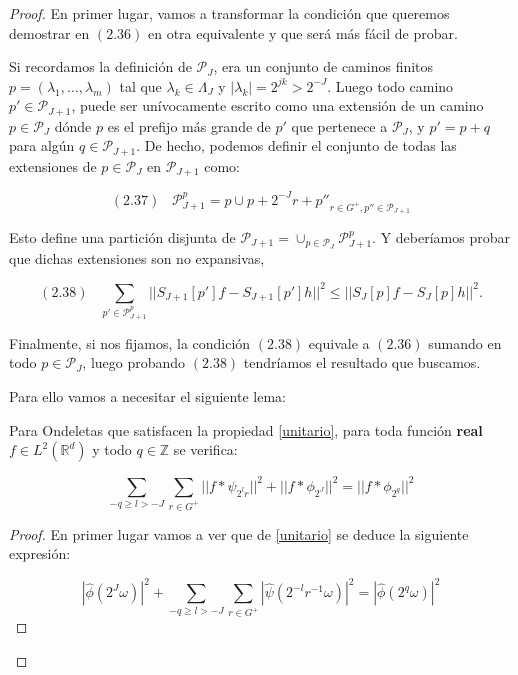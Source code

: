 \begin{proof}

\noindent En primer lugar, vamos a transformar la condición que queremos demostrar en $(2.36)$ en otra equivalente y que será más fácil de probar.

\medskip

\noindent Si recordamos la definición de $\mathcal{P}_J$, era un conjunto de caminos finitos $p=(\lambda_1,...,\lambda_m)$ tal que $\lambda_k\in\Lambda_J$ y $|\lambda_k|=2^{jk}>2^{-J}$. Luego todo camino $p' \in \mathcal{P}_{J+1}$, puede ser unívocamente escrito como una extensión de un camino $p\in \mathcal{P}_J$ dónde $p$ es el prefijo más grande de $p'$ que pertenece a $\mathcal{P}_J$, y $p'=p+q$ para algún $q\in \mathcal{P}_{J+1}$. De hecho, podemos definir el conjunto de todas las extensiones de $p\in \mathcal{P}_J$ en $\mathcal{P}_{J+1}$ como: 

$$(2.37) \;\;\; \mathcal{P}_{J+1}^{p}={p} \cup {p+2^{-J}r+p''}_{r\in G^{+},p''\in \mathcal{P}_{J+1}}$$

Esto define una partición disjunta de $\mathcal{P}_{J+1}=\cup_{p \in \mathcal{P}_J} \mathcal{P}_{J+1}^{p}$. Y deberíamos probar que dichas extensiones son no expansivas,

$$(2.38) \;\;\; \sum_{p' \in \mathcal{P}_{J+1}^p} || S_{J+1}[p']f-S_{J+1}[p']h||^2 \leq ||S_{J}[p]f-S_J [p]h||^2.$$

\noindent Finalmente, si nos fijamos, la condición $(2.38)$ equivale a $(2.36)$ sumando en todo $p\in \mathcal{P}_J$, luego probando $(2.38)$ tendríamos el resultado que buscamos. 


\medskip


\noindent Para ello vamos a necesitar el siguiente lema:

\begin{lema}
  Para Ondeletas que satisfacen la propiedad \autoref{unitario}, para toda función \textbf{real} $f\in L^2(\mathbb{R}^d)$ y todo $q \in \mathbb{Z}$ se verifica: 

  $$\sum_{-q\geq l > -J} \sum_{r \in G^+} || f \ast \psi_{2^lr}||^2 + || f \ast \phi_{2^J}||^2 = || f \ast \phi_{2^q} ||^2$$

\end{lema}

\begin{proof}

  \noindent En primer lugar vamos a ver que de \autoref{unitario} se deduce la siguiente expresión: 

  $$|\widehat{\phi}(2^J \omega)|^2 + \sum_{-q\geq l > -J} \sum_{r \in G^+}|\widehat{\psi}(2^{-l}r^{-1} \omega)|^2=|\widehat{\phi}(2^q \omega) |^2$$


\end{proof}
\end{proof}
